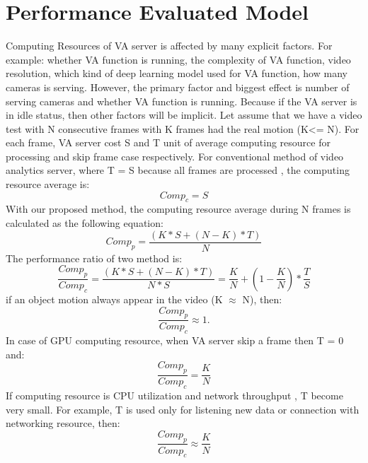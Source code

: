 \section{ Performance Evaluated Model}
Computing Resources of VA server is affected by many explicit factors. For example:  whether VA function is running, the complexity of VA function, video resolution, which kind of deep learning model used for VA function, how many cameras is serving. However, the primary factor and biggest effect is number of serving cameras and whether VA function is running. Because if  the VA server is in idle status, then other factors will be implicit. Let assume that we have a video test with N consecutive frames with K frames had the real motion (K<= N).  For each frame, VA server cost S and T unit  of average computing resource  for processing and skip frame case respectively.
For conventional method  of video analytics server, where T = S because all frames are processed , the computing resource average is:\\
\begin{equation}
\label{eqn:3}
Comp_{c}=S
\end{equation}
With our proposed method, the computing resource average during N frames  is calculated as the following equation:\\
\begin{equation}
\label{eqn:4}
Comp_{p}=\frac{(K*S+(N-K)*T)}{N}
\end{equation}
The performance ratio of two method is: \\
\begin{equation}
\label{eqn:5}
\frac{Comp_{p}}{Comp_{c}}=\frac{(K*S+(N-K)*T)}{N*S}=\frac{K}{N} + (1 - \frac{K}{N})*\frac{T}{S}
\end{equation}
if an object motion always appear in the video (K $\approx$ N), then: \\
\begin{equation}
\label{eqn:6}
 \frac{Comp_{p}}{Comp_{c}}\approx 1.
\end{equation}
In case of GPU computing resource, when VA server skip a frame then T = 0 and:\\
\begin{equation}
\label{eqn:7}
\frac{Comp_{p}}{Comp_{c}} = \frac{K}{N}
\end{equation}
 If computing resource is CPU utilization and  network throughput ,  T become very small. For example, T is used only for listening new data or connection with networking resource, then: \\
\begin{equation}
\label{eqn:8}
 \frac{Comp_{p}}{Comp_{c}} \approx \frac{K}{N}
\end{equation}